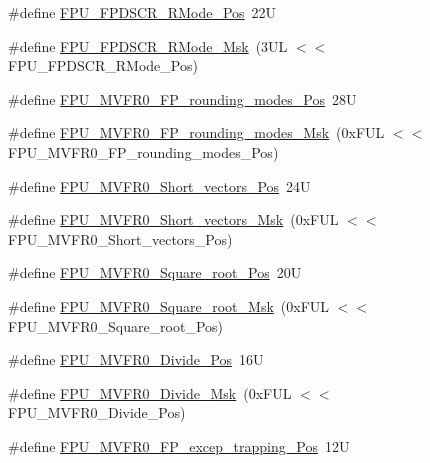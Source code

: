 \begin{DoxyCompactItemize}
\item 
\#define \mbox{\hyperlink{group___c_m_s_i_s___f_p_u_ga7aeedf36be8f170dd3e276028e8e29ed}{F\+P\+U\+\_\+\+F\+P\+D\+S\+C\+R\+\_\+\+R\+Mode\+\_\+\+Pos}}~22U
\item 
\#define \mbox{\hyperlink{group___c_m_s_i_s___f_p_u_ga449beb50211f8e97df6b2640c82c4741}{F\+P\+U\+\_\+\+F\+P\+D\+S\+C\+R\+\_\+\+R\+Mode\+\_\+\+Msk}}~(3\+U\+L $<$$<$ F\+P\+U\+\_\+\+F\+P\+D\+S\+C\+R\+\_\+\+R\+Mode\+\_\+\+Pos)
\item 
\#define \mbox{\hyperlink{group___c_m_s_i_s___f_p_u_ga1ebcc9076f08013f0ea814540df03e82}{F\+P\+U\+\_\+\+M\+V\+F\+R0\+\_\+\+F\+P\+\_\+rounding\+\_\+modes\+\_\+\+Pos}}~28U
\item 
\#define \mbox{\hyperlink{group___c_m_s_i_s___f_p_u_gae6dc9339ac72227d5d54360bb9fbef1b}{F\+P\+U\+\_\+\+M\+V\+F\+R0\+\_\+\+F\+P\+\_\+rounding\+\_\+modes\+\_\+\+Msk}}~(0x\+F\+U\+L $<$$<$ F\+P\+U\+\_\+\+M\+V\+F\+R0\+\_\+\+F\+P\+\_\+rounding\+\_\+modes\+\_\+\+Pos)
\item 
\#define \mbox{\hyperlink{group___c_m_s_i_s___f_p_u_gabbf83a918536ebf10889cee71a0404c7}{F\+P\+U\+\_\+\+M\+V\+F\+R0\+\_\+\+Short\+\_\+vectors\+\_\+\+Pos}}~24U
\item 
\#define \mbox{\hyperlink{group___c_m_s_i_s___f_p_u_gabf261a72023fdfc64f32c6b21d55c5b9}{F\+P\+U\+\_\+\+M\+V\+F\+R0\+\_\+\+Short\+\_\+vectors\+\_\+\+Msk}}~(0x\+F\+U\+L $<$$<$ F\+P\+U\+\_\+\+M\+V\+F\+R0\+\_\+\+Short\+\_\+vectors\+\_\+\+Pos)
\item 
\#define \mbox{\hyperlink{group___c_m_s_i_s___f_p_u_ga176c85453ba03257bf263adec05f7344}{F\+P\+U\+\_\+\+M\+V\+F\+R0\+\_\+\+Square\+\_\+root\+\_\+\+Pos}}~20U
\item 
\#define \mbox{\hyperlink{group___c_m_s_i_s___f_p_u_ga3ec0bfec1640bdaf9dff027f275b446d}{F\+P\+U\+\_\+\+M\+V\+F\+R0\+\_\+\+Square\+\_\+root\+\_\+\+Msk}}~(0x\+F\+U\+L $<$$<$ F\+P\+U\+\_\+\+M\+V\+F\+R0\+\_\+\+Square\+\_\+root\+\_\+\+Pos)
\item 
\#define \mbox{\hyperlink{group___c_m_s_i_s___f_p_u_ga167be203091e6cc7d00ad40ca48c4396}{F\+P\+U\+\_\+\+M\+V\+F\+R0\+\_\+\+Divide\+\_\+\+Pos}}~16U
\item 
\#define \mbox{\hyperlink{group___c_m_s_i_s___f_p_u_gaeb7370768c6cdf06f8a15c86c6102ed2}{F\+P\+U\+\_\+\+M\+V\+F\+R0\+\_\+\+Divide\+\_\+\+Msk}}~(0x\+F\+U\+L $<$$<$ F\+P\+U\+\_\+\+M\+V\+F\+R0\+\_\+\+Divide\+\_\+\+Pos)
\item 
\#define \mbox{\hyperlink{group___c_m_s_i_s___f_p_u_ga5c0715c41c4470f8bb0b6dcd34707f1c}{F\+P\+U\+\_\+\+M\+V\+F\+R0\+\_\+\+F\+P\+\_\+excep\+\_\+trapping\+\_\+\+Pos}}~12U
$$
\end{DoxyCompactItemize}
